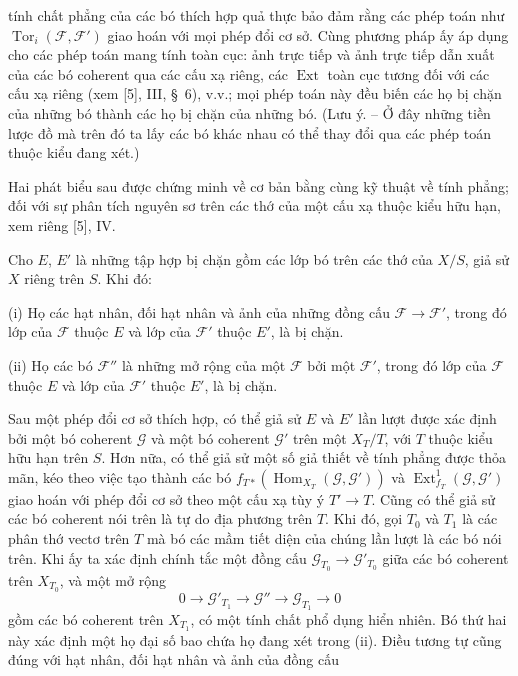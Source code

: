 tính chất phẳng của các bó thích hợp quả thực bảo đảm rằng các phép toán như
$\operatorname{Tor}_i(\mathcal F,\mathcal F')$ giao hoán với mọi phép đổi cơ
sở. Cùng phương pháp ấy áp dụng cho các phép toán mang tính toàn cục: ảnh trực
tiếp và ảnh trực tiếp dẫn xuất của các bó coherent qua các cấu xạ riêng, các
$\operatorname{Ext}$ toàn cục tương đối với các cấu xạ riêng (xem [5], III,
\S~6), v.v.; mọi phép toán này đều biến các họ bị chặn của những bó thành các
họ bị chặn của những bó. (Lưu ý. -- Ở đây những tiền lược đồ mà trên đó ta lấy
các bó khác nhau có thể thay đổi qua các phép toán thuộc kiểu đang xét.)

Hai phát biểu sau được chứng minh về cơ bản bằng cùng kỹ thuật về tính phẳng;
đối với sự phân tích nguyên sơ trên các thớ của một cấu xạ thuộc kiểu hữu hạn,
xem riêng [5], IV.

 Cho $E$, $E'$ là những tập hợp bị chặn gồm các lớp bó
trên các thớ của $X/S$, giả sử $X$ riêng trên $S$. Khi đó:

\medskip
\noindent (i) Họ các hạt nhân, đối hạt nhân và ảnh của những đồng cấu
$\mathcal F\longrightarrow\mathcal F'$, trong đó lớp của $\mathcal F$ thuộc
$E$ và lớp của $\mathcal F'$ thuộc $E'$, là bị chặn.

\smallskip
\noindent (ii) Họ các bó $\mathcal F''$ là những mở rộng của một $\mathcal F$
bởi một $\mathcal F'$, trong đó lớp của $\mathcal F$ thuộc $E$ và lớp của
$\mathcal F'$ thuộc $E'$, là bị chặn.

Sau một phép đổi cơ sở thích hợp, có thể giả sử $E$ và $E'$ lần lượt được xác
định bởi một bó coherent $\mathcal G$ và một bó coherent $\mathcal G'$ trên
một $X_T/T$, với $T$ thuộc kiểu hữu hạn trên $S$. Hơn nữa, có thể giả sử một
số giả thiết về tính phẳng được thỏa mãn, kéo theo việc tạo thành các bó
$f_{T*}(\operatorname{Hom}_{X_T}(\mathcal G,\mathcal G'))$ và
$\operatorname{Ext}^{1}_{f_T}(\mathcal G,\mathcal G')$ giao hoán với phép đổi
cơ sở theo một cấu xạ tùy ý $T'\longrightarrow T$. Cũng có thể giả sử các bó
coherent nói trên là tự do địa phương trên $T$. Khi đó, gọi $T_0$ và $T_1$
là các phân thớ vectơ trên $T$ mà bó các mầm tiết diện của chúng lần lượt là
các bó nói trên. Khi ấy ta xác định chính tắc một đồng cấu
$\mathcal G_{T_0}\longrightarrow\mathcal G'_{T_0}$ giữa các bó coherent trên
$X_{T_0}$, và một mở rộng
\[
0\longrightarrow\mathcal G'_{T_1}\longrightarrow\mathcal G''
\longrightarrow\mathcal G_{T_1}\longrightarrow0
\]
gồm các bó coherent trên $X_{T_1}$, có một tính chất phổ dụng hiển nhiên. Bó
thứ hai này xác định một họ đại số bao chứa họ đang xét trong (ii). Điều tương
tự cũng đúng với hạt nhân, đối hạt nhân và ảnh của đồng cấu
